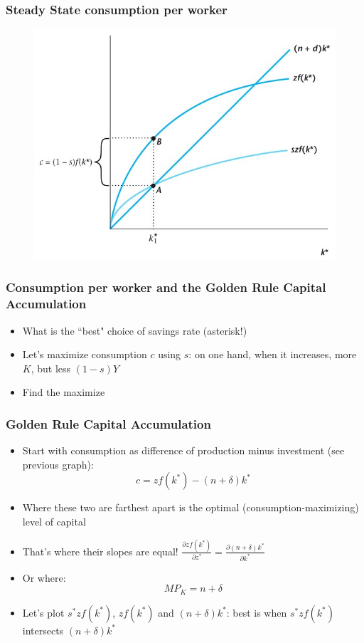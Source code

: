 \documentclass{beamer}
\begin{document}
\begin{frame}
\frametitle[alignment=center]{Steady State consumption per worker}
\begin{figure}
\centering
\includegraphics[scale=0.5]{Figures/W_Fig_7pt17.png}
\end{figure}
\end{frame}


\begin{frame}
\frametitle[alignment=center]{Consumption per worker and the Golden Rule Capital Accumulation}
\begin{itemize}
\item What is the ``best" choice of savings rate (asterisk!)
\bigskip
\item Let's maximize consumption $c$ using $s$:  on one hand, when it increases, more $K$, but less $(1-s)Y$
\bigskip
\item Find the maximize
\end{itemize}
\end{frame}


\begin{frame}
\frametitle[alignment=center]{Golden Rule Capital Accumulation}
\begin{itemize}
\item Start with consumption as difference of production minus investment (see previous graph):
$$c=zf(k^*)-(n+\delta)k^*$$
\item Where these two are farthest apart is the optimal (consumption-maximizing) level of capital
\bigskip
\item That's where their slopes are equal! $\frac{\partial zf(k^*)}{\partial z^*}=\frac{\partial (n+\delta)k^*}{\partial k^*}$
\bigskip
\item Or where:
$$MP_K=n+\delta$$
\bigskip
\item Let's plot $s^*zf(k^*)$, $zf(k^*)$ and $(n+\delta)k^*$:  best is when $s^*zf(k^*)$ intersects $(n+\delta)k^*$
\end{itemize}
\end{frame}
\end{document}
